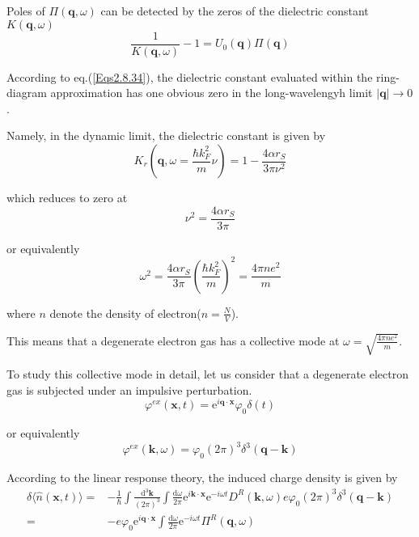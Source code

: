 Poles of $\Pi(\mathbf{q},\omega)$ can be detected by the zeros of the dielectric constant $K(\mathbf{q},\omega)$
\begin{equation} \label{Eqs3.2.1}
\frac{1}{K(\mathbf{q},\omega)} - 1 = U_0(\mathbf{q}) \Pi(\mathbf{q})
\end{equation}

According to eq.(\ref{Eqs2.8.34}), the dielectric constant evaluated within the ring-diagram approximation has one obvious zero in the long-wavelengyh limit $|\mathbf{q}| \rightarrow 0$.

Namely, in the dynamic limit, the dielectric constant is given by
\begin{equation*} \tag{2.8.34}
K_r(\mathbf{q},\omega = \frac{\hbar k_F^2}{m}\nu) = 1- \frac{4\alpha r_S}{3\pi \nu^2}
\end{equation*}

which reduces to zero at
\[\nu^2 = \frac{4\alpha r_S}{3\pi}\]

or equivalently
\begin{equation} \label{Eqs3.2.2}
\omega^2 = \frac{4\alpha r_S}{3\pi} \left( \frac{\hbar k_F^2}{m} \right)^2 = \frac{4\pi n e^2}{m}
\end{equation}

where $n$ denote the density of electron($n = \frac{N}{V}$).

This means that a degenerate electron gas has a collective mode at $\omega = \sqrt{\frac{4\pi n e^2}{m}}$.

To study this collective mode in detail, let us consider that a degenerate electron gas is subjected under an impulsive perturbation.
\begin{equation} \label{Eqs3.2.3}
\varphi^{ex}(\mathbf{x},t) = \mathrm{e}^{i \mathbf{q} \cdot \mathbf{x}} \varphi_0 \delta(t)
\end{equation}

or equivalently
\begin{equation*} \label{Eqs3.2.3'} \tag{3.2.3'}
\varphi^{ex}(\mathbf{k},\omega) = \varphi_0 (2\pi)^3 \delta^3(\mathbf{q}-\mathbf{k})
\end{equation*}

According to the linear response theory, the induced charge density is given by
\begin{equation} \label{Eqs3.2.4} \begin{split}
\delta \langle \hat{n}(\mathbf{x},t) \rangle =&-\frac{1}{\hbar} \int \frac{\mathrm{d}^3 \mathbf{k}}{(2\pi)^3} \int \frac{\mathrm{d}\omega}{2\pi} \mathrm{e}^{i \mathbf{k} \cdot \mathbf{x}} \mathrm{e}^{-i \omega t} D^R(\mathbf{k},\omega) e \varphi_0 (2\pi)^3 \delta^3(\mathbf{q}-\mathbf{k})\\
=& - e \varphi_0 \mathrm{e}^{i \mathbf{q} \cdot \mathbf{x}} \int \frac{\mathrm{d}\omega}{2\pi}\mathrm{e}^{-i \omega t} \Pi^R(\mathbf{q},\omega)
\end{split}\end{equation}

